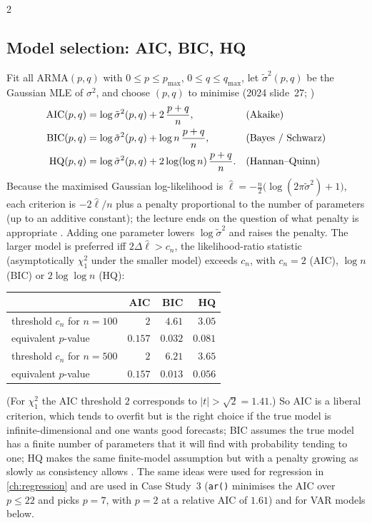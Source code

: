 \begin{paracol}{2}
\subsection{Model selection: AIC, BIC, HQ}\label{ch09:sec-modelsel}
Fit all ARMA$(p,q)$ with $0\le p\le p_{\max}$, $0\le q\le q_{\max}$, let $\tilde\sigma^2(p,q)$ be the Gaussian MLE of
$\sigma^2$, and choose $(p,q)$ to minimise (2024 slide~27; )
\begin{align}
  \mathrm{AIC}(p,q)&=\log\tilde\sigma^2(p,q)+2\,\frac{p+q}n, &&\text{(Akaike)}\notag\\
  \mathrm{BIC}(p,q)&=\log\tilde\sigma^2(p,q)+\log n\,\frac{p+q}n, &&\text{(Bayes / Schwarz)}\label{ch09:eq-ic}\\
  \mathrm{HQ}(p,q)&=\log\tilde\sigma^2(p,q)+2\log(\log n)\,\frac{p+q}n. &&\text{(Hannan--Quinn)}\notag
\end{align}
Because the maximised Gaussian log-likelihood is $\hat\ell=-\frac n2\bigl(\log(2\pi\tilde\sigma^2)+1\bigr)$, each criterion is
$-2\hat\ell/n$ plus a penalty proportional to the number of parameters (up to an additive constant); the lecture ends on the question
of what penalty is appropriate . Adding one parameter lowers $\log\tilde\sigma^2$ and raises the penalty. The larger
model is preferred iff $2\Delta\hat\ell>c_n$, the likelihood-ratio statistic (asymptotically $\chi^2_1$ under the smaller model)
exceeds $c_n$, with $c_n=2$ (AIC), $\log n$ (BIC) or $2\log\log n$ (HQ):
\begin{center}\small
\begin{tabular}{@{}l rrr@{}}
\toprule
 & AIC & BIC & HQ\\
\midrule
threshold $c_n$ for $n=100$ & $2$ & $4.61$ & $3.05$\\
\quad equivalent $p$-value & $0.157$ & $0.032$ & $0.081$\\
threshold $c_n$ for $n=500$ & $2$ & $6.21$ & $3.65$\\
\quad equivalent $p$-value & $0.157$ & $0.013$ & $0.056$\\
\bottomrule
\end{tabular}
\end{center}
(For $\chi^2_1$ the AIC threshold $2$ corresponds to $|t|>\sqrt2=1.41$.) So AIC is a liberal criterion, which tends to overfit but
is the right choice if the true model is infinite-dimensional and one wants good forecasts; BIC assumes the true model has a finite number
of parameters that it will find with probability tending to one; HQ makes the same finite-model assumption but with a penalty
growing as slowly as consistency allows . The same ideas were used for regression in
\cref{ch:regression} and are used in Case Study~3 (\texttt{ar()} minimises the AIC over $p\le22$ and picks $p=7$, with $p=2$ at a
relative AIC of $1.61$) and for VAR models below.


\end{paracol}
